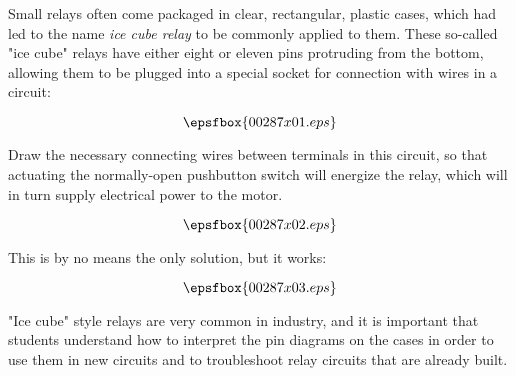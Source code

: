 

Small relays often come packaged in clear, rectangular, plastic cases, which had led to the name {\it ice cube relay} to be commonly applied to them.  These so-called "ice cube" relays have either eight or eleven pins protruding from the bottom, allowing them to be plugged into a special socket for connection with wires in a circuit:

$$\epsfbox{00287x01.eps}$$

Draw the necessary connecting wires between terminals in this circuit, so that actuating the normally-open pushbutton switch will energize the relay, which will in turn supply electrical power to the motor.

$$\epsfbox{00287x02.eps}$$







This is by no means the only solution, but it works:

$$\epsfbox{00287x03.eps}$$







"Ice cube" style relays are very common in industry, and it is important that students understand how to interpret the pin diagrams on the cases in order to use them in new circuits and to troubleshoot relay circuits that are already built.




